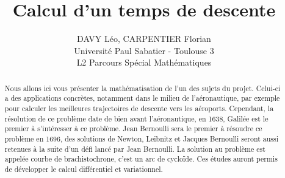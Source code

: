 \documentclass[a4paper,10pt]{article}
\title{Calcul d'un temps de descente}
\author{DAVY L\'eo, CARPENTIER Florian \\
\small Universit\'e Paul Sabatier - Toulouse 3 \\
\small L2 Parcours Sp\'ecial Math\'ematiques}
\begin{document}
\maketitle
\newtheorem{theorem}{Theor\`eme}
\begin{abstract}
Nous allons ici vous pr\'esenter la math\'ematisation de l'un des sujets du projet. Celui-ci a des applications concr\`etes, notamment dans le milieu de l'a\'eronautique, par exemple
pour calculer les meilleures trajectoires de descente vers les a\'eroports. Cependant, la r\'esolution de ce probl\`eme date de bien avant l'a\'eronautique, en 1638, Galil\'ee est le premier \`a s'int\'eresser
\`a ce probl\`eme. Jean Bernoulli sera le premier \`a r\'esoudre ce probl\`eme en 1696, des solutions de Newton, Leibnitz et Jacques Bernoulli seront aussi retenues \`a la suite d'un d\'efi lanc\'e
par Jean Bernoulli. La solution au probl\`eme est appel\'ee courbe de brachistochrone, c'est un arc de cycloïde. Ces \'etudes auront permis de d\'evelopper le calcul diff\'erentiel et variationnel.
\end{abstract}
\end{document}
